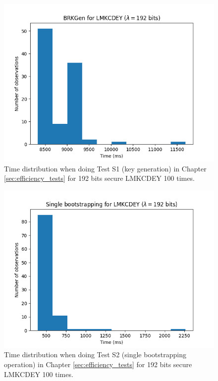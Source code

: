 \begin{figure}[ht]
    \centering
    \includegraphics[width=0.8\linewidth]{data/figures/LMKCDEY_STD192_BRKGen.png}
    \caption{Time distribution when doing Test S1 (key generation) in Chapter \ref{sec:efficiency_tests} for 192 bits secure LMKCDEY 100 times.}
    \label{fig:distr_lmkcdey192_keygen}
\end{figure}

\begin{figure}[ht]
    \centering
    \includegraphics[width=0.8\linewidth]{data/figures/LMKCDEY_STD192_Single_bootstrapping.png}
    \caption{Time distribution when doing Test S2 (single bootstrapping operation) in Chapter \ref{sec:efficiency_tests} for 192 bits secure LMKCDEY 100 times.}
    \label{fig:distr_lmkcdey192_bs}
\end{figure}

